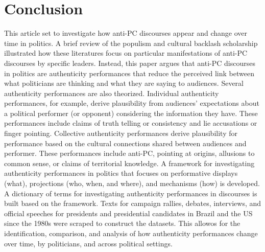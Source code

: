 \documentclass[smallextended]{svjour3}       %
\begin{document}
\hypertarget{conclusion}{%
\section{Conclusion}\label{conclusion}}

This article set to investigate how anti-PC discourses appear and change
over time in politics. A brief review of the populism and cultural
backlash scholarship illustrated how these literatures focus on
particular manifestations of anti-PC discourses by specific leaders.
Instead, this paper argues that anti-PC discourses in politics are
authenticity performances that reduce the perceived link between what
politicians are thinking and what they are saying to audiences. Several
authenticity performances are also theorized. Individual authenticity
performances, for example, derive plausibility from audiences'
expectations about a political performer (or opponent) considering the
information they have. These performances include claims of truth
telling or consistency and lie accusations or finger pointing.
Collective authenticity performances derive plausibility for performance
based on the cultural connections shared between audiences and
performer. These performances include anti-PC, pointing at origins,
allusions to common sense, or claims of territorial knowledge. A
framework for investigating authenticity performances in politics that
focuses on performative displays (what), projections (who, when, and
where), and mechanisms (how) is developed. A dictionary of terms for
investigating authenticity performances in discourses is built based on
the framework. Texts for campaign rallies, debates, interviews, and
official speeches for presidents and presidential candidates in Brazil
and the US since the 1980s were scraped to construct the datasets. This
allowos for the identification, comparison, and analysis of how
authenticity performances change over time, by politicians, and across
political settings.
\end{document}
